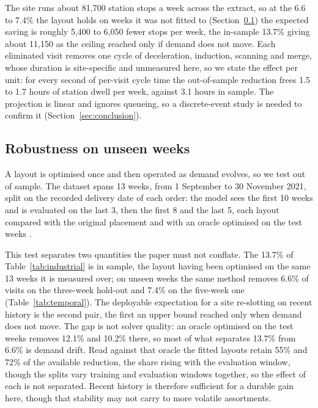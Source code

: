 \documentclass[]{interact}
\begin{document}
The site runs about 81,700 station stops a week across the extract, so at the 6.6 to 7.4\% the layout holds on weeks it was not fitted to (Section~\ref{sec:temporal}) the expected saving is roughly 5,400 to 6,050 fewer stops per week, the in-sample 13.7\% giving about 11,150 as the ceiling reached only if demand does not move. Each eliminated visit removes one cycle of deceleration, induction, scanning and merge, whose duration is site-specific and unmeasured here, so we state the effect per unit: for every second of per-visit cycle time the out-of-sample reduction frees 1.5 to 1.7 hours of station dwell per week, against 3.1 hours in sample. The projection is linear and ignores queueing, so a discrete-event study is needed to confirm it (Section~\ref{sec:conclusion}).

\subsection{Robustness on unseen weeks}\label{sec:temporal}
A layout is optimised once and then operated as demand evolves, so we test out of sample. The dataset spans 13 weeks, from 1 September to 30 November 2021, split on the recorded delivery date of each order: the model sees the first 10 weeks and is evaluated on the last 3, then the first 8 and the last 5, each layout compared with the original placement and with an oracle optimised on the test weeks \citep{lee2020cie, wang2020}.

This test separates two quantities the paper must not conflate. The 13.7\% of Table~\ref{tab:industrial} is in sample, the layout having been optimised on the same 13 weeks it is measured over; on unseen weeks the same method removes 6.6\% of visits on the three-week hold-out and 7.4\% on the five-week one (Table~\ref{tab:temporal}). The deployable expectation for a site re-slotting on recent history is the second pair, the first an upper bound reached only when demand does not move. The gap is not solver quality: an oracle optimised on the test weeks removes 12.1\% and 10.2\% there, so most of what separates 13.7\% from 6.6\% is demand drift. Read against that oracle the fitted layouts retain 55\% and 72\% of the available reduction, the share rising with the evaluation window, though the splits vary training and evaluation windows together, so the effect of each is not separated. Recent history is therefore sufficient for a durable gain here, though that stability may not carry to more volatile assortments.
\end{document}
